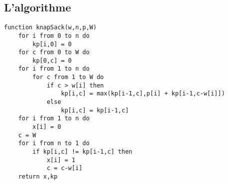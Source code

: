 \documentclass{mybourbaki}
\begin{document}
\subsection{L'algorithme}

\begin{lstlisting}
function knapSack(w,n,p,W)
	for i from 0 to n do
		kp[i,0] = 0
	for c from 0 to W do
		kp[0,c] = 0
	for i from 1 to n do
		for c from 1 to W do
			if c > w[i] then
				kp[i,c] = max(kp[i-1,c],p[i] + kp[i-1,c-w[i]])
			else
				kp[i,c] = kp[i-1,c]
	for i from 1 to n do
		x[i] = 0
	c = W
	for i from n to 1 do
		if kp[i,c] != kp[i-1,c] then
			x[i] = 1
			c = c-w[i]				
	return x,kp						
\end{lstlisting}
\end{document}
